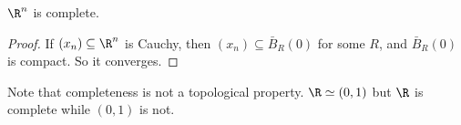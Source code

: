 \documentclass[a4paper]{article}
\begin{document}
\begin{cor}
  $\R^n$ is complete.
\end{cor}

\begin{proof}
  If $(x_n) \subseteq \R^n$ is Cauchy, then $(x_n) \subseteq \bar B_R (0) $ for some $R$, and $\bar{B}_R(0)$ is compact. So it converges.
\end{proof}

Note that completeness is not a topological property. $\R\simeq (0, 1)$ but $\R$ is complete while $(0, 1)$ is not.
\end{document}
